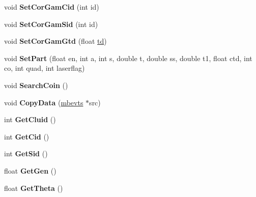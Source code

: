 \begin{DoxyCompactItemize}
\item 
\hypertarget{classmbevts_ad225b203c9ced65bf3560027da64386f}{void {\bfseries Set\-Cor\-Gam\-Cid} (int id)}\label{classmbevts_ad225b203c9ced65bf3560027da64386f}

\item 
\hypertarget{classmbevts_ac45f4603202f0ab85a53eaa5a673bef5}{void {\bfseries Set\-Cor\-Gam\-Sid} (int id)}\label{classmbevts_ac45f4603202f0ab85a53eaa5a673bef5}

\item 
\hypertarget{classmbevts_ad7d391a92762ab040292cb7b3e8418d2}{void {\bfseries Set\-Cor\-Gam\-Gtd} (float \hyperlink{classmbevts_a577bfcdc97c54ad53a452200dff118e2}{td})}\label{classmbevts_ad7d391a92762ab040292cb7b3e8418d2}

\item 
\hypertarget{classmbevts_a22851a0facbaef765719ba81163f9fbf}{void {\bfseries Set\-Part} (float en, int a, int s, double t, double ss, double t1, float ctd, int co, int quad, int laserflag)}\label{classmbevts_a22851a0facbaef765719ba81163f9fbf}

\item 
\hypertarget{classmbevts_a87461604de891dbc34c31fcd8af590af}{void {\bfseries Search\-Coin} ()}\label{classmbevts_a87461604de891dbc34c31fcd8af590af}

\item 
\hypertarget{classmbevts_a3dd5bb0d3f29f7aacf8fe47a999b145e}{void {\bfseries Copy\-Data} (\hyperlink{classmbevts}{mbevts} $\ast$src)}\label{classmbevts_a3dd5bb0d3f29f7aacf8fe47a999b145e}

\item 
\hypertarget{classmbevts_a1c5fb6ab284e545a6b217d62f0071704}{int {\bfseries Get\-Cluid} ()}\label{classmbevts_a1c5fb6ab284e545a6b217d62f0071704}

\item 
\hypertarget{classmbevts_a14e93c89cf1cd54c013258018408f502}{int {\bfseries Get\-Cid} ()}\label{classmbevts_a14e93c89cf1cd54c013258018408f502}

\item 
\hypertarget{classmbevts_a9d6088f98d2cbf47a2b800707f69d329}{int {\bfseries Get\-Sid} ()}\label{classmbevts_a9d6088f98d2cbf47a2b800707f69d329}

\item 
\hypertarget{classmbevts_a77ebeb78945522f0aeeb72f3ba1f7778}{float {\bfseries Get\-Gen} ()}\label{classmbevts_a77ebeb78945522f0aeeb72f3ba1f7778}

\item 
\hypertarget{classmbevts_aa960d2d6dcb37527ec7c61bb47ae7112}{float {\bfseries Get\-Theta} ()}\label{classmbevts_aa960d2d6dcb37527ec7c61bb47ae7112}


\end{DoxyCompactItemize}
